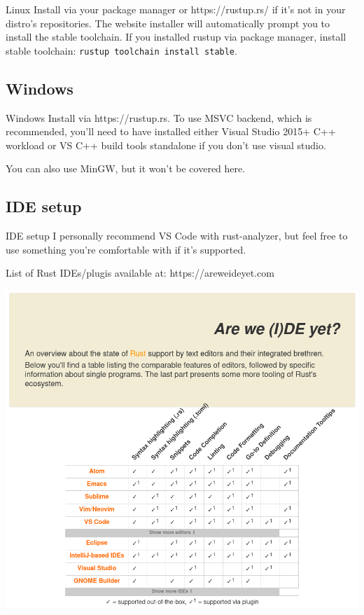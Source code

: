 \documentclass[
  9pt,
  ignorenonframetext,
]{beamer}
\newcommand{\passthrough}[1]{#1}
\begin{document}
\begin{frame}[fragile]{Linux}
Install via your package manager or https://rustup.rs/ if it's not in
your distro's repositories. The website installer will automatically
prompt you to install the stable toolchain. If you installed rustup via
package manager, install stable toolchain:
\passthrough{\lstinline!rustup toolchain install stable!}.
\end{frame}

\hypertarget{windows}{%
\subsection{Windows}\label{windows}}

\begin{frame}{Windows}
Install via https://rustup.rs. To use MSVC backend, which is
recommended, you'll need to have installed either Visual Studio 2015+
C++ workload or VS C++ build tools standalone if you don't use visual
studio.

You can also use MinGW, but it won't be covered here.
\end{frame}

\hypertarget{ide-setup}{%
\subsection{IDE setup}\label{ide-setup}}

\begin{frame}{IDE setup}
I personally recommend VS Code with rust-analyzer, but feel free to use
something you're comfortable with if it's supported.

List of Rust IDEs/plugis available at: https://areweideyet.com

\includegraphics{img/ides.png}
\end{frame}
\end{document}
